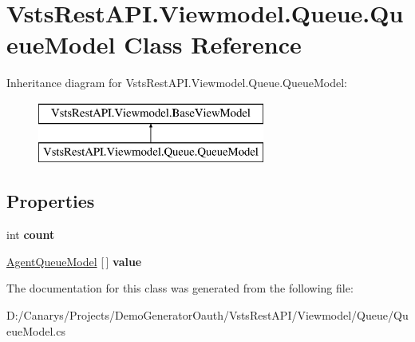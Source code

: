 \hypertarget{class_vsts_rest_a_p_i_1_1_viewmodel_1_1_queue_1_1_queue_model}{}\section{Vsts\+Rest\+A\+P\+I.\+Viewmodel.\+Queue.\+Queue\+Model Class Reference}
\label{class_vsts_rest_a_p_i_1_1_viewmodel_1_1_queue_1_1_queue_model}
Inheritance diagram for Vsts\+Rest\+A\+P\+I.\+Viewmodel.\+Queue.\+Queue\+Model\+:\begin{figure}[H]
\begin{center}
\leavevmode
\includegraphics[height=2.000000cm]{class_vsts_rest_a_p_i_1_1_viewmodel_1_1_queue_1_1_queue_model}
\end{center}
\end{figure}
\subsection*{Properties}
\begin{DoxyCompactItemize}
\item 
\mbox{\label{class_vsts_rest_a_p_i_1_1_viewmodel_1_1_queue_1_1_queue_model_a4f8d502dfe624167b4ba40c922c1296c}} 
int {\bfseries count}
\item 
\mbox{\label{class_vsts_rest_a_p_i_1_1_viewmodel_1_1_queue_1_1_queue_model_af3ef37f6850474d688bf96afa9db231b}} 
\mbox{\hyperlink{class_vsts_rest_a_p_i_1_1_viewmodel_1_1_queue_1_1_agent_queue_model}{Agent\+Queue\+Model}} \mbox{[}$\,$\mbox{]} {\bfseries value}
\end{DoxyCompactItemize}


The documentation for this class was generated from the following file\+:\begin{DoxyCompactItemize}
\item 
D\+:/\+Canarys/\+Projects/\+Demo\+Generator\+Oauth/\+Vsts\+Rest\+A\+P\+I/\+Viewmodel/\+Queue/Queue\+Model.\+cs\end{DoxyCompactItemize}
